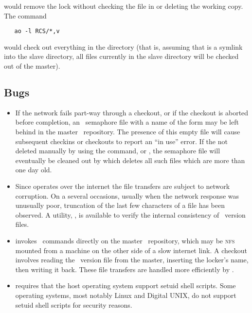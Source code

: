 \noindent
would remove the lock without checking the file in or deleting the working
copy.  The command

\begin{verbatim}
   ao -l RCS/*,v
\end{verbatim}

\noindent
would check out everything in the directory (that is, assuming that 
is a symlink into the slave directory, all files currently in the slave
directory will be checked out of the master).

\subsection*{Bugs}

\begin{itemize}
\item
   If the network fails part-way through a checkout, or if the checkout is
   aborted before completion, an \rcs\ semaphore file with a name of the
   form \file{,*,} may be left behind in the master \rcs\ repository.  The
   presence of this empty file will cause subsequent checkins or checkouts to
   report an ``in use'' error.  If the not deleted manually by using the
    command, or , the semaphore file will
   eventually be cleaned out by  which deletes all such files
   which are more than one day old.

\item
   Since  operates over the internet the file transfers are
   subject to network corruption.  On a several occasions, usually when the
   network response was unusually poor, truncation of the last few characters
   of a file has been observed.  A utility, , is available to
   verify the internal consistency of \rcs\ version files.

\item
    invokes \rcs\ commands directly on the master \rcs\ repository,
   which may be \textsc{nfs} mounted from a machine on the other side of a
   slow internet link.  A checkout involves reading the \rcs\ version file from
   the master, inserting the locker's name, then writing it back.  These file
   transfers are handled more efficiently by .

\item
    requires that the host operating system support setuid shell
   scripts.  Some operating systems, most notably Linux and Digital
   UNIX, do not support setuid shell scripts for security reasons.
\end{itemize}

